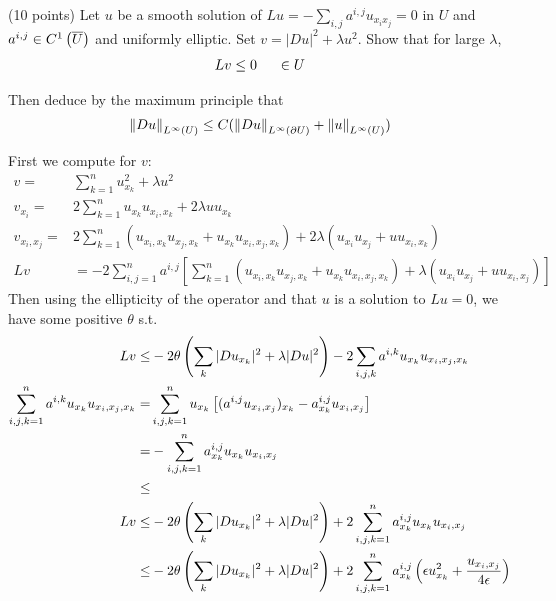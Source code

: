 (10 points)
Let $u$ be a smooth solution of $L u = -\sum_{i, j} a^{i, j} u_{x_i x_j} = 0$ in $U$
and $a^{i, j} \in C^{1}\left(\overline {U} \right)$ and uniformly elliptic.
Set $v = |D u|^2 + \lambda u^2$.
Show that for large $\lambda$,
\begin{align*}
  L v \leq 0 \hspace{5mm} \in U
\end{align*}

Then deduce by the maximum principle that
\begin{align*}
  \left\lVert D u\right\rVert_{L^{\infty}(U)} \leq C (\left\lVert D u\right\rVert_{L^{\infty}(\partial U)} + \left\lVert u\right\rVert_{L^{\infty}(U)})
\end{align*}

First we compute for $v$:
\begin{align*}
  v = &\sum_{k = 1}^{n} u_{x_k}^2 + \lambda u^2\\
  v_{x_i} = &2 \sum_{k = 1}^{n} u_{x_k} u_{x_i, x_k} + 2 \lambda u u_{x_k}\\
  v_{x_i, x_j} = &2 \sum_{k = 1}^{n} (u_{x_i, x_k} u_{x_j, x_k} + u_{x_k} u_{x_i, x_j, x_k}) + 2 \lambda (u_{x_i} u_{x_j} + u u_{x_i, x_k})\\
  L v &= -2 \sum_{i, j = 1}^{n} a^{i, j}
            \left[ \sum_{k = 1}^{n} (u_{x_i, x_k} u_{x_j, x_k} + u_{x_k} u_{x_i, x_j, x_k})
                   + \lambda (u_{x_i} u_{x_j} + u u_{x_i, x_j})
            \right]
\end{align*}
Then using the ellipticity of the operator and that $u$ is a solution to $L u = 0$,
we have some positive $\theta$ s.t.
\begin{align*}
  L v %
      \leq &-2 \theta \left( \sum_{k} |\grad u_{x_k}|^2 + \lambda |\grad u|^2 \right) - 2 \sum_{i, j, k} a^{i, k} u_{x_k} u_{x_i, x_j, x_k}\\
  \sum_{i, j, k = 1}^{n} a^{i, k} u_{x_k} u_{x_i, x_j, x_k}
    = &\sum_{i, j, k = 1}^{n} u_{x_k} \left[ (a^{i, j} u_{x_i, x_j})_{x_k} - a^{i, j}_{x_k} u_{x_i, x_j} \right]\\
    = &-\sum_{i, j, k = 1}^{n} a^{i, j}_{x_k} u_{x_k} u_{x_i, x_j}\\
 \leq &\\
  L v \leq &-2 \theta \left( \sum_{k} |\grad u_{x_k}|^2 + \lambda |\grad u|^2 \right) + 2 \sum_{i, j, k = 1}^{n} a^{i, j}_{x_k} u_{x_k} u_{x_i, x_j}\\
  \leq &-2 \theta \left( \sum_{k} |\grad u_{x_k}|^2 + \lambda |\grad u|^2 \right) + 2 \sum_{i, j, k = 1}^{n} a^{i, j}_{x_k} \left(\epsilon u_{x_k}^2 + \frac{u_{x_i, x_j}}{4 \epsilon}\right)\\
\end{align*}
